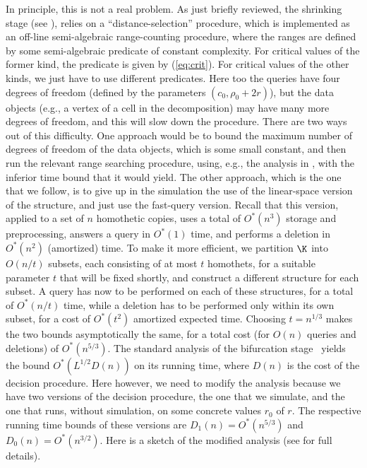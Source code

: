 %
In principle, this is not a real problem. As just briefly reviewed, the shrinking stage 
(see \cite{BFKKS,CH,KKSS}), relies on a ``distance-selection'' procedure, which is
implemented as an off-line semi-algebraic range-counting procedure, where the ranges
are defined by some semi-algebraic predicate of constant complexity. For critical
values of the former kind, the predicate is given by (\ref{eq:crit}). For critical
values of the other kinds, we just have to use different predicates. Here too the
queries have four degrees of freedom (defined by the parameters $(c_0,\rho_0+2r)$), 
but the data objects (e.g., a vertex of a cell in the decomposition) may have many more 
degrees of freedom, and this will slow down the procedure.
%
There are two ways out of this difficulty. One approach would be to bound the maximum 
number of degrees of freedom of the data objects, which is some small constant, and then run the relevant range 
searching procedure, using, e.g., the analysis in \cite[Appendix]{AAEKS}, with the
inferior time bound that it would yield. The other approach, which is the one that we follow,
is to give up in the simulation the use of the linear-space version of the structure,
and just use the fast-query version.
%
Recall that this version, applied to a set of $n$ homothetic copies, uses a total of $O^*(n^3)$
storage and preprocessing, answers a query in $O^*(1)$ time, and performs a deletion in
$O^*(n^2)$ (amortized) time. To make it more efficient, we partition $\K$ into $O(n/t)$ subsets, 
each consisting of at most $t$ homothets, for a suitable parameter $t$ that will be fixed shortly,
and construct a different structure for each subset. 
A query has now to be performed on each of these structures, for a total of $O^*(n/t)$ time,
while a deletion has to be performed only within its own subset, for a cost of $O^*(t^2)$
amortized expected time. Choosing $t=n^{1/3}$ makes the two bounds asymptotically the same, 
for a total cost (for $O(n)$ queries and deletions) of $O^*(n^{5/3})$.
%
The standard analysis of the bifurcation stage~\cite{BFKKS} yields the bound $O^*(L^{1/2}D(n))$ on its
running time, where $D(n)$ is the cost of the decision procedure. Here however, we need to
modify the analysis because we have two versions of the decision procedure, the one that we 
simulate, and the one that runs, without simulation, on some concrete values $r_0$ of $r$.
The respective running time bounds of these versions are $D_1(n) = O^*(n^{5/3})$ and
$D_0(n) = O^*(n^{3/2})$.
%
Here is a sketch of the modified analysis (see \cite{BFKKS,KKSS} for full details). 
